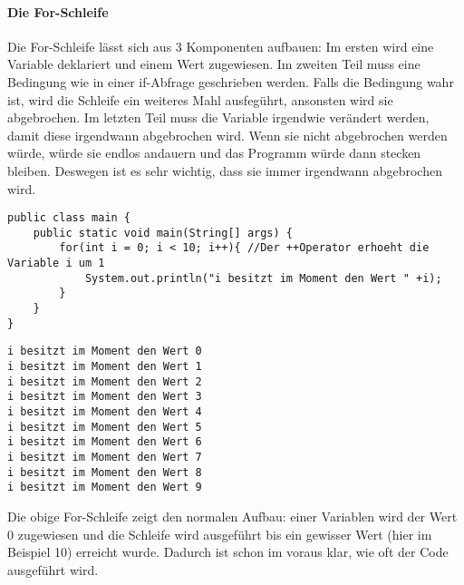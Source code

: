 \paragraph{Die For-Schleife}
Die For-Schleife lässt sich aus 3 Komponenten aufbauen: Im ersten wird eine Variable deklariert und einem Wert zugewiesen. Im zweiten Teil muss eine Bedingung wie in einer if-Abfrage geschrieben werden. Falls die Bedingung wahr ist, wird die Schleife ein weiteres Mahl ausfegührt, ansonsten wird sie abgebrochen. Im letzten Teil muss die Variable irgendwie verändert werden, damit diese irgendwann abgebrochen wird. Wenn sie nicht abgebrochen werden würde, würde sie endlos andauern und das Programm würde dann stecken bleiben. Deswegen ist es sehr wichtig, dass sie immer irgendwann abgebrochen wird.
\begin{lstlisting}
public class main {
	public static void main(String[] args) {
		for(int i = 0; i < 10; i++){ //Der ++Operator erhoeht die Variable i um 1
			System.out.println("i besitzt im Moment den Wert " +i);
		}
	}
}
\end{lstlisting}
\begin{lstlisting}[style=console]
i besitzt im Moment den Wert 0
i besitzt im Moment den Wert 1
i besitzt im Moment den Wert 2
i besitzt im Moment den Wert 3
i besitzt im Moment den Wert 4
i besitzt im Moment den Wert 5
i besitzt im Moment den Wert 6
i besitzt im Moment den Wert 7
i besitzt im Moment den Wert 8
i besitzt im Moment den Wert 9
\end{lstlisting}
Die obige For-Schleife zeigt den normalen Aufbau: einer Variablen wird der Wert 0 zugewiesen und die Schleife wird ausgeführt bis ein gewisser Wert (hier im Beispiel 10) erreicht wurde. Dadurch ist schon im voraus klar, wie oft der Code ausgeführt wird.
